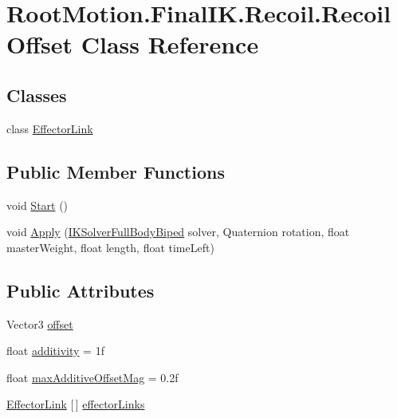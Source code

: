 \hypertarget{class_root_motion_1_1_final_i_k_1_1_recoil_1_1_recoil_offset}{}\section{Root\+Motion.\+Final\+I\+K.\+Recoil.\+Recoil\+Offset Class Reference}
\label{class_root_motion_1_1_final_i_k_1_1_recoil_1_1_recoil_offset}
\subsection*{Classes}
\begin{DoxyCompactItemize}
\item 
class \mbox{\hyperlink{class_root_motion_1_1_final_i_k_1_1_recoil_1_1_recoil_offset_1_1_effector_link}{Effector\+Link}}
\end{DoxyCompactItemize}
\subsection*{Public Member Functions}
\begin{DoxyCompactItemize}
\item 
void \mbox{\hyperlink{class_root_motion_1_1_final_i_k_1_1_recoil_1_1_recoil_offset_ae98bd1dbc84179a4487360f6cefa8cc0}{Start}} ()
\item 
void \mbox{\hyperlink{class_root_motion_1_1_final_i_k_1_1_recoil_1_1_recoil_offset_a9d7b215fa954a8e92907b93ca33dccf5}{Apply}} (\mbox{\hyperlink{class_root_motion_1_1_final_i_k_1_1_i_k_solver_full_body_biped}{I\+K\+Solver\+Full\+Body\+Biped}} solver, Quaternion rotation, float master\+Weight, float length, float time\+Left)
\end{DoxyCompactItemize}
\subsection*{Public Attributes}
\begin{DoxyCompactItemize}
\item 
Vector3 \mbox{\hyperlink{class_root_motion_1_1_final_i_k_1_1_recoil_1_1_recoil_offset_ad91a3fff7d60aff749daf11fb8858e65}{offset}}
\item 
float \mbox{\hyperlink{class_root_motion_1_1_final_i_k_1_1_recoil_1_1_recoil_offset_afd20f60ad6884fd19795e70e4756ae53}{additivity}} = 1f
\item 
float \mbox{\hyperlink{class_root_motion_1_1_final_i_k_1_1_recoil_1_1_recoil_offset_a93420580aa264e3d81b482de1b016629}{max\+Additive\+Offset\+Mag}} = 0.\+2f
\item 
\mbox{\hyperlink{class_root_motion_1_1_final_i_k_1_1_recoil_1_1_recoil_offset_1_1_effector_link}{Effector\+Link}} \mbox{[}$\,$\mbox{]} \mbox{\hyperlink{class_root_motion_1_1_final_i_k_1_1_recoil_1_1_recoil_offset_a1ff4b3bebb09d50762aafdc516de12fc}{effector\+Links}}
\end{DoxyCompactItemize}


